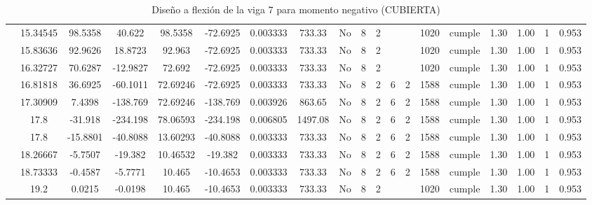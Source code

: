 \begin{table}[H]
{\begin{tabular}{|c|c|c|c|c|c|r|c|c|c|c|c|c|c|c|c|c|c|c|}
\cline{2-19}    & 15.34545 & 98.5358 & 40.622 & 98.5358 & -72.6925 & 0.003333 & 733.33 & No  & 8   & 2   &     &     & 1020 & \cellcolor[rgb]{ .776,  .937,  .808}cumple & 1.30 & 1.00 & 1   & 0.953 \bigstrut\\
\cline{2-19}    & 15.83636 & 92.9626 & 18.8723 & 92.963 & -72.6925 & 0.003333 & 733.33 & No  & 8   & 2   &     &     & 1020 & \cellcolor[rgb]{ .776,  .937,  .808}cumple & 1.30 & 1.00 & 1   & 0.953 \bigstrut\\
\cline{2-19}    & 16.32727 & 70.6287 & -12.9827 & 72.692 & -72.6925 & 0.003333 & 733.33 & No  & 8   & 2   &     &     & 1020 & \cellcolor[rgb]{ .776,  .937,  .808}cumple & 1.30 & 1.00 & 1   & 0.953 \bigstrut\\
\cline{2-19}    & 16.81818 & 36.6925 & -60.1011 & 72.69246 & -72.6925 & 0.003333 & 733.33 & No  & 8   & 2   & 6   & 2   & 1588 & \cellcolor[rgb]{ .776,  .937,  .808}cumple & 1.30 & 1.00 & 1   & 0.953 \bigstrut\\
\cline{2-19}    & 17.30909 & 7.4398 & -138.769 & 72.69246 & -138.769 & 0.003926 & 863.65 & No  & 8   & 2   & 6   & 2   & 1588 & \cellcolor[rgb]{ .776,  .937,  .808}cumple & 1.30 & 1.00 & 1   & 0.953 \bigstrut\\
\cline{2-19}    & \cellcolor[rgb]{ .851,  .882,  .949}17.8 & -31.918 & -234.198 & 78.06593 & -234.198 & 0.006805 & 1497.08 & No  & 8   & 2   & 6   & 2   & 1588 & \cellcolor[rgb]{ .776,  .937,  .808}cumple & 1.30 & 1.00 & 1   & 0.953 \bigstrut\\
\cline{2-19}    & \cellcolor[rgb]{ .851,  .882,  .949}17.8 & -15.8801 & -40.8088 & 13.60293 & -40.8088 & 0.003333 & 733.33 & No  & 8   & 2   & 6   & 2   & 1588 & \cellcolor[rgb]{ .776,  .937,  .808}cumple & 1.30 & 1.00 & 1   & 0.953 \bigstrut\\
\cline{2-19}    & 18.26667 & -5.7507 & -19.382 & 10.46532 & -19.382 & 0.003333 & 733.33 & No  & 8   & 2   & 6   & 2   & 1588 & \cellcolor[rgb]{ .776,  .937,  .808}cumple & 1.30 & 1.00 & 1   & 0.953 \bigstrut\\
\cline{2-19}    & 18.73333 & -0.4587 & -5.7771 & 10.465 & -10.4653 & 0.003333 & 733.33 & No  & 8   & 2   & 6   & 2   & 1588 & \cellcolor[rgb]{ .776,  .937,  .808}cumple & 1.30 & 1.00 & 1   & 0.953 \bigstrut\\
\cline{2-19}    & 19.2 & 0.0215 & -0.0198 & 10.465 & -10.4653 & 0.003333 & 733.33 & No  & 8   & 2   &     &     & 1020 & \cellcolor[rgb]{ .776,  .937,  .808}cumple & 1.30 & 1.00 & 1   & 0.953 \bigstrut\\
\hline
\end{tabular}%

  }
      \caption{Diseño a flexión de la viga 7 para momento negativo (CUBIERTA) }
  \label{tab:F VG7 CUB M-}%
\end{table}%
